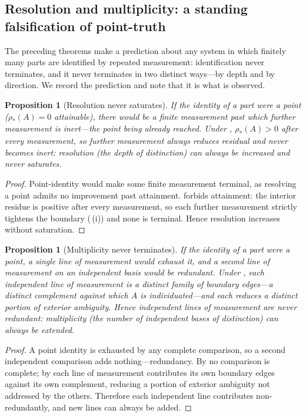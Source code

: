 \documentclass[11pt,a4paper]{article}
\theoremstyle{thmstyle}
\newtheorem{proposition}[theorem]{Proposition}
\theoremstyle{definition}
\theoremstyle{remark}
\newcommand{\idres}{\rho_{\!*}}            %
\begin{document}
\subsection{Resolution and multiplicity: a standing falsification of point-truth}

The preceding theorems make a prediction about any system in which finitely many
parts are identified by repeated measurement: identification never terminates, and
it never terminates in two distinct ways---by depth and by direction. We record
the prediction and note that it is what is observed.

\begin{proposition}[Resolution never saturates]
\label{prop:resolution}
If the identity of a part were a point \textup{(}$\idres(A)=0$ attainable\textup{)},
there would be a finite measurement past which further measurement is inert---the
point being already reached. Under , $\idres(A)>0$ after
every measurement, so further measurement always reduces residual and never
becomes inert: \emph{resolution} \textup{(}the depth of distinction\textup{)} can
always be increased and never saturates.
\end{proposition}

\begin{proof}
Point-identity would make some finite measurement terminal, as resolving a point
admits no improvement past attainment.  forbids attainment:
the interior residue is positive after every measurement, so each further
measurement strictly tightens the boundary (\,(i)) and
none is terminal. Hence resolution increases without saturation.
\end{proof}

\begin{proposition}[Multiplicity never terminates]
\label{prop:multiplicity}
If the identity of a part were a point, a single line of measurement would exhaust
it, and a second line of measurement on an independent basis would be redundant.
Under , each independent line of measurement is a distinct
family of boundary edges---a distinct complement against which $A$ is
individuated---and each reduces a distinct portion of exterior ambiguity. Hence
independent lines of measurement are never redundant: \emph{multiplicity}
\textup{(}the number of independent bases of distinction\textup{)} can always be
extended.
\end{proposition}

\begin{proof}
A point identity is exhausted by any complete comparison, so a second independent
comparison adds nothing---redundancy. By  no comparison is
complete; by  each line of measurement contributes its
own boundary edges against its own complement, reducing a portion of exterior
ambiguity not addressed by the others. Therefore each independent line contributes
non-redundantly, and new lines can always be added.
\end{proof}
\end{document}
